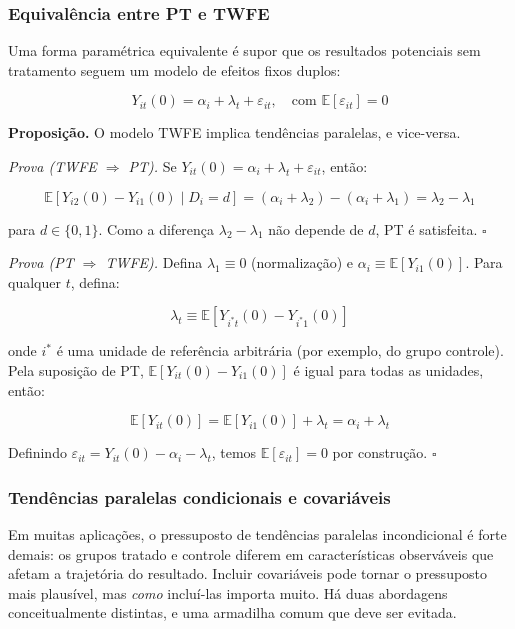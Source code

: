 \documentclass[
]{article}
\begin{document}
\subsubsection{Equivalência entre PT e TWFE}\label{equivaluxeancia-entre-pt-e-twfe}

Uma forma paramétrica equivalente é supor que os resultados potenciais sem tratamento seguem um modelo de efeitos fixos duplos:

\[
Y_{it}(0) = \alpha_i + \lambda_t + \varepsilon_{it}, \quad \text{com } \mathbb{E}[\varepsilon_{it}] = 0
\]

\textbf{Proposição.} O modelo TWFE implica tendências paralelas, e vice-versa.

\emph{Prova (TWFE \(\Rightarrow\) PT).} Se \(Y_{it}(0) = \alpha_i + \lambda_t + \varepsilon_{it}\), então:

\[
\mathbb{E}[Y_{i2}(0) - Y_{i1}(0) \mid D_i = d] = (\alpha_i + \lambda_2) - (\alpha_i + \lambda_1) = \lambda_2 - \lambda_1
\]

para \(d \in \{0, 1\}\). Como a diferença \(\lambda_2 - \lambda_1\) não depende de \(d\), PT é satisfeita. \(\square\)

\emph{Prova (PT \(\Rightarrow\) TWFE).} Defina \(\lambda_1 \equiv 0\) (normalização) e \(\alpha_i \equiv \mathbb{E}[Y_{i1}(0)]\). Para qualquer \(t\), defina:

\[
\lambda_t \equiv \mathbb{E}[Y_{i^*t}(0) - Y_{i^*1}(0)]
\]

onde \(i^*\) é uma unidade de referência arbitrária (por exemplo, do grupo controle). Pela suposição de PT, \(\mathbb{E}[Y_{it}(0) - Y_{i1}(0)]\) é igual para todas as unidades, então:

\[
\mathbb{E}[Y_{it}(0)] = \mathbb{E}[Y_{i1}(0)] + \lambda_t = \alpha_i + \lambda_t
\]

Definindo \(\varepsilon_{it} = Y_{it}(0) - \alpha_i - \lambda_t\), temos \(\mathbb{E}[\varepsilon_{it}] = 0\) por construção. \(\square\)

\subsubsection{Tendências paralelas condicionais e covariáveis}\label{tenduxeancias-paralelas-condicionais-e-covariuxe1veis}

Em muitas aplicações, o pressuposto de tendências paralelas incondicional é forte demais: os grupos tratado e controle diferem em características observáveis que afetam a trajetória do resultado. Incluir covariáveis pode tornar o pressuposto mais plausível, mas \emph{como} incluí-las importa muito. Há duas abordagens conceitualmente distintas, e uma armadilha comum que deve ser evitada.
\end{document}
